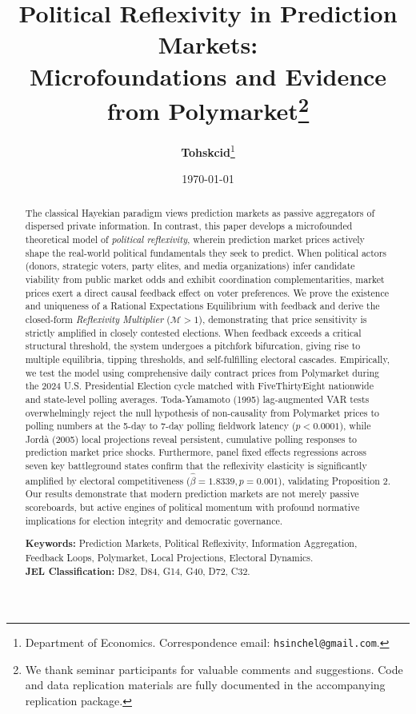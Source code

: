 \documentclass[12pt]{article}
\title{\textbf{Political Reflexivity in Prediction Markets:\\Microfoundations and Evidence from Polymarket}\thanks{We thank seminar participants for valuable comments and suggestions. Code and data replication materials are fully documented in the accompanying replication package.}}
\author{
    \textbf{Tohskcid}\thanks{Department of Economics. Correspondence email: \texttt{hsinchel@gmail.com}.}
}
\date{\today}
\begin{document}
\maketitle

\begin{abstract}
\noindent The classical Hayekian paradigm views prediction markets as passive aggregators of dispersed private information. In contrast, this paper develops a microfounded theoretical model of \textit{political reflexivity}, wherein prediction market prices actively shape the real-world political fundamentals they seek to predict. When political actors (donors, strategic voters, party elites, and media organizations) infer candidate viability from public market odds and exhibit coordination complementarities, market prices exert a direct causal feedback effect on voter preferences. We prove the existence and uniqueness of a Rational Expectations Equilibrium with feedback and derive the closed-form \textit{Reflexivity Multiplier} ($\mathcal{M} > 1$), demonstrating that price sensitivity is strictly amplified in closely contested elections. When feedback exceeds a critical structural threshold, the system undergoes a pitchfork bifurcation, giving rise to multiple equilibria, tipping thresholds, and self-fulfilling electoral cascades. Empirically, we test the model using comprehensive daily contract prices from Polymarket during the 2024 U.S. Presidential Election cycle matched with FiveThirtyEight nationwide and state-level polling averages. Toda-Yamamoto (1995) lag-augmented VAR tests overwhelmingly reject the null hypothesis of non-causality from Polymarket prices to polling numbers at the 5-day to 7-day polling fieldwork latency ($p < 0.0001$), while Jordà (2005) local projections reveal persistent, cumulative polling responses to prediction market price shocks. Furthermore, panel fixed effects regressions across seven key battleground states confirm that the reflexivity elasticity is significantly amplified by electoral competitiveness ($\hat{\beta} = 1.8339, p = 0.001$), validating Proposition 2. Our results demonstrate that modern prediction markets are not merely passive scoreboards, but active engines of political momentum with profound normative implications for election integrity and democratic governance.
\vspace{1ex}

\noindent \textbf{Keywords:} Prediction Markets, Political Reflexivity, Information Aggregation, Feedback Loops, Polymarket, Local Projections, Electoral Dynamics. \\
\noindent \textbf{JEL Classification:} D82, D84, G14, G40, D72, C32.
\end{abstract}
\end{document}
